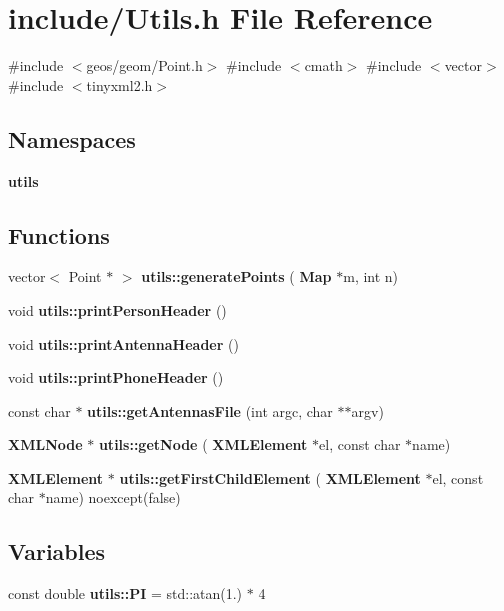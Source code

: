 \section{include/\+Utils.h File Reference}
\label{_utils_8h}
{\ttfamily \#include $<$geos/geom/\+Point.\+h$>$}\newline
{\ttfamily \#include $<$cmath$>$}\newline
{\ttfamily \#include $<$vector$>$}\newline
{\ttfamily \#include $<$tinyxml2.\+h$>$}\newline
\subsection*{Namespaces}
\begin{DoxyCompactItemize}
\item 
 \textbf{ utils}
\end{DoxyCompactItemize}
\subsection*{Functions}
\begin{DoxyCompactItemize}
\item 
vector$<$ Point $\ast$ $>$ \textbf{ utils\+::generate\+Points} (\textbf{ Map} $\ast$m, int n)
\item 
void \textbf{ utils\+::print\+Person\+Header} ()
\item 
void \textbf{ utils\+::print\+Antenna\+Header} ()
\item 
void \textbf{ utils\+::print\+Phone\+Header} ()
\item 
const char $\ast$ \textbf{ utils\+::get\+Antennas\+File} (int argc, char $\ast$$\ast$argv)
\item 
\textbf{ X\+M\+L\+Node} $\ast$ \textbf{ utils\+::get\+Node} (\textbf{ X\+M\+L\+Element} $\ast$el, const char $\ast$name)
\item 
\textbf{ X\+M\+L\+Element} $\ast$ \textbf{ utils\+::get\+First\+Child\+Element} (\textbf{ X\+M\+L\+Element} $\ast$el, const char $\ast$name) noexcept(false)
\end{DoxyCompactItemize}
\subsection*{Variables}
\begin{DoxyCompactItemize}
\item 
const double \textbf{ utils\+::\+PI} = std\+::atan(1.) $\ast$ 4
\end{DoxyCompactItemize}
